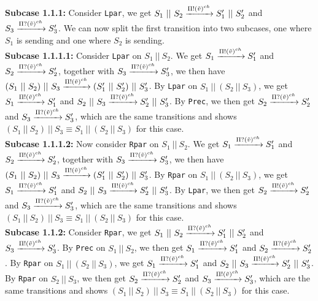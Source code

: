 \indent \indent \textbf{Subcase 1.1.1: } Consider \texttt{Lpar}, we get $S_1 \ || \ S_2 \xrightarrow[]{\Pi ! (\Tilde{v})^{ch}} S_1' \ || \ S_2'$ and $S_3 \xrightarrow[]{\Pi ? (\Tilde{v})^{ch}} S_3'$. We can now split the first transition into two subcases, one where $S_1$ is sending and one where $S_2$ is sending.\\
\indent \indent \indent \textbf{Subcase 1.1.1.1: } Consider \texttt{Lpar} on $S_1\ ||\ S_2$. We get $S_1 \xrightarrow[]{\Pi ! (\Tilde{v})^{ch}} S_1'$ and $S_2 \xrightarrow[]{\Pi ? (\Tilde{v})^{ch}} S_2'$, together with $S_3 \xrightarrow[]{\Pi ? (\Tilde{v})^{ch}} S_3'$, we then have $(S_1 \ || \ S_2)\ ||\ S_3 \xrightarrow[]{\Pi ! (\Tilde{v})^{ch}} (S_1' \ || \ S_2')\ ||\ S_3'$. By \texttt{Lpar} on $S_1 \ ||\ (S_2 \ || \ S_3)$, we get $S_1 \xrightarrow[]{\Pi ! (\Tilde{v})^{ch}} S_1'$ and $S_2 \ || \ S_3 \xrightarrow[]{\Pi ? (\Tilde{v})^{ch}} S_2' \ || \ S_3'$. By \texttt{Prec}, we then get $S_2 \xrightarrow[]{\Pi ? (\Tilde{v})^{ch}} S_2'$ and $S_3 \xrightarrow[]{\Pi ? (\Tilde{v})^{ch}} S_3'$, which are the same transitions and shows $(S_1 \ ||\ S_2 )\ || \ S_3 \equiv S_1 \ ||\ (S_2 \ || \ S_3)$ for this case.\\
\indent \indent \indent \textbf{Subcase 1.1.1.2: } Now consider \texttt{Rpar} on $S_1\ ||\ S_2$. We get $S_1 \xrightarrow[]{\Pi ? (\Tilde{v})^{ch}} S_1'$ and $S_2 \xrightarrow[]{\Pi ! (\Tilde{v})^{ch}} S_2'$, together with $S_3 \xrightarrow[]{\Pi ? (\Tilde{v})^{ch}} S_3'$, we then have $(S_1 \ || \ S_2)\ ||\ S_3 \xrightarrow[]{\Pi ! (\Tilde{v})^{ch}} (S_1' \ || \ S_2')\ ||\ S_3'$. By \texttt{Rpar} on $S_1 \ ||\ (S_2 \ || \ S_3)$, we get $S_1 \xrightarrow[]{\Pi ? (\Tilde{v})^{ch}} S_1'$ and $S_2 \ || \ S_3 \xrightarrow[]{\Pi ! (\Tilde{v})^{ch}} S_2' \ || \ S_3'$. By \texttt{Lpar}, we then get $S_2 \xrightarrow[]{\Pi ! (\Tilde{v})^{ch}} S_2'$ and $S_3 \xrightarrow[]{\Pi ? (\Tilde{v})^{ch}} S_3'$, which are the same transitions and shows $(S_1 \ ||\ S_2 )\ || \ S_3 \equiv S_1 \ ||\ (S_2 \ || \ S_3)$ for this case.\\
\indent \indent \textbf{Subcase 1.1.2: } Consider \texttt{Rpar}, we get $S_1 \ || \ S_2 \xrightarrow[]{\Pi ? (\Tilde{v})^{ch}} S_1' \ || \ S_2'$ and $S_3 \xrightarrow[]{\Pi ! (\Tilde{v})^{ch}} S_3'$. By \texttt{Prec} on $S_1\ ||\ S_2$, we then get $S_1 \xrightarrow[]{\Pi ? (\Tilde{v})^{ch}} S_1'$ and $S_2 \xrightarrow[]{\Pi ? (\Tilde{v})^{ch}} S_2'$. By \texttt{Rpar} on $S_1 \ ||\ (S_2 \ || \ S_3)$, we get $S_1 \xrightarrow[]{\Pi ? (\Tilde{v})^{ch}} S_1'$ and $S_2 \ || \ S_3 \xrightarrow[]{\Pi ! (\Tilde{v})^{ch}} S_2' \ || \ S_3'$. By \texttt{Rpar} on $S_2\ ||\ S_3$, we then get $S_2 \xrightarrow[]{\Pi ? (\Tilde{v})^{ch}} S_2'$ and $S_3 \xrightarrow[]{\Pi ! (\Tilde{v})^{ch}} S_3'$, which are the same transitions and shows $(S_1 \ ||\ S_2 )\ || \ S_3 \equiv S_1 \ ||\ (S_2 \ || \ S_3)$ for this case.\\

